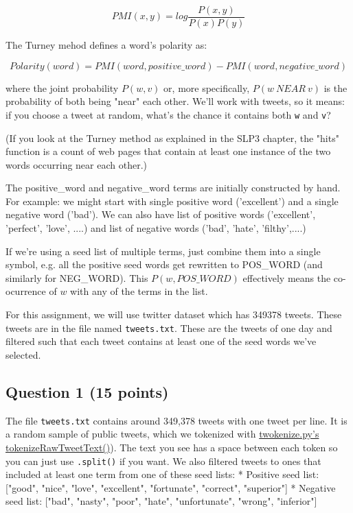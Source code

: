 \documentclass[11pt]{article}
\begin{document}
\[PMI(x, y) = log\frac{ P(x, y) }{ P(x)P(y)}\]

The Turney mehod defines a word's polarity as:

\[Polarity(word) = PMI(word, positive\_word)−PMI(word, negative\_word)\]

where the joint probability \(P(w, v)\) or, more specifically,
\(P(w\ NEAR\ v)\) is the probability of both being "near" each other.
We'll work with tweets, so it means: if you choose a tweet at random,
what's the chance it contains both \texttt{w} and \texttt{v}?

(If you look at the Turney method as explained in the SLP3 chapter, the
"hits" function is a count of web pages that contain at least one
instance of the two words occurring near each other.)

The positive\_word and negative\_word terms are initially constructed by
hand. For example: we might start with single positive word
('excellent') and a single negative word ('bad'). We can also have list
of positive words ('excellent', 'perfect', 'love', ....) and list of
negative words ('bad', 'hate', 'filthy',....)

If we're using a seed list of multiple terms, just combine them into a
single symbol, e.g. all the positive seed words get rewritten to
POS\_WORD (and similarly for NEG\_WORD). This \(P(w, POS\_WORD)\)
effectively means the co-ocurrence of \(w\) with any of the terms in the
list.

For this assignment, we will use twitter dataset which has 349378
tweets. These tweets are in the file named \texttt{tweets.txt}. These
are the tweets of one day and filtered such that each tweet contains at
least one of the seed words we've selected.

    \subsection{Question 1 (15 points)}\label{question-1-15-points}

The file \texttt{tweets.txt} contains around 349,378 tweets with one
tweet per line. It is a random sample of public tweets, which we
tokenized with
\href{https://github.com/myleott/ark-twokenize-py/blob/master/twokenize.py}{twokenize.py's
tokenizeRawTweetText()}). The text you see has a space between each
token so you can just use \texttt{.split()} if you want. We also
filtered tweets to ones that included at least one term from one of
these seed lists: * Positive seed list: {[}"good", "nice", "love",
"excellent", "fortunate", "correct", "superior"{]} * Negative seed list:
{[}"bad", "nasty", "poor", "hate", "unfortunate", "wrong", "inferior"{]}
\end{document}
